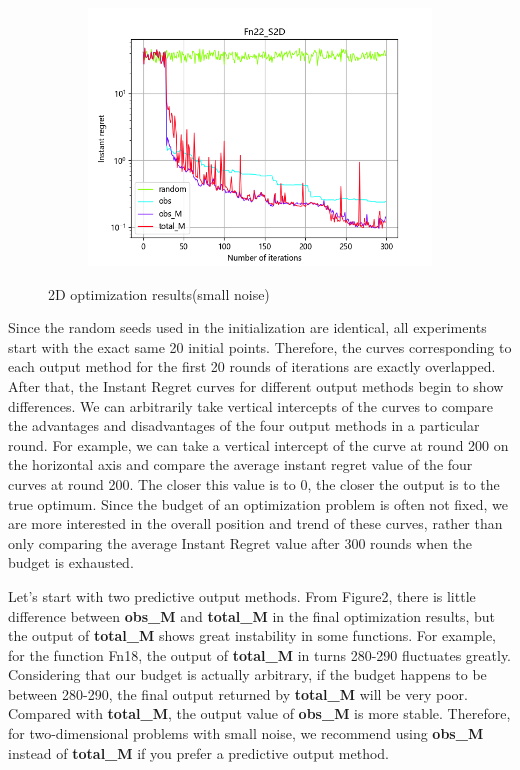 \documentclass{article}
\begin{document}
\begin{figure}[H]
\begin{subfigure}[t]{.32\linewidth}
        \includegraphics[width=1\textwidth]{pictures/Homo_noise_2D/S/Fn22_S2D_ins.png}
    \end{subfigure}
    \caption{2D optimization results(small noise)}
    \label{Fig2}
\end{figure}

\hspace{2em}Since the random seeds used in the initialization are identical, all experiments start with the exact same 20 initial points. Therefore, the curves corresponding to each output method for the first 20 rounds of iterations are exactly overlapped. After that, the Instant Regret curves for different output methods begin to show differences. We can arbitrarily take vertical intercepts of the curves to compare the advantages and disadvantages of the four output methods in a particular round. For example, we can take a vertical intercept of the curve at round 200 on the horizontal axis and compare the average instant regret value of the four curves at round 200. The closer this value is to 0, the closer the output is to the true optimum. Since the budget of an optimization problem is often not fixed, we are more interested in the overall position and trend of these curves, rather than only comparing the average Instant Regret value after 300 rounds when the budget is exhausted.

\hspace{2em}Let's start with two predictive output methods. From Figure2, there is little difference between \textbf{obs\_M} and \textbf{total\_M} in the final optimization results, but the output of \textbf{total\_M} shows great instability in some functions. For example, for the function Fn18, the output of \textbf{total\_M} in turns 280-290 fluctuates greatly. Considering that our budget is actually arbitrary, if the budget happens to be between 280-290, the final output returned by \textbf{total\_M} will be very poor. Compared with \textbf{total\_M}, the output value of \textbf{obs\_M} is more stable. Therefore, for two-dimensional problems with small noise, we recommend using \textbf{obs\_M} instead of \textbf{total\_M} if you prefer a predictive output method.
\end{document}
